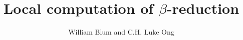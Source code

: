 \documentclass{elsart}
\begin{document}
\begin{frontmatter}
\title{Local computation of $\beta$-reduction}
\author{William Blum and C.H. Luke Ong}
\address{Oxford University Computing Laboratory}
\end{frontmatter}

\maketitle \tableofcontents \bigskip

\listoftodos
\bigskip





\end{document}
